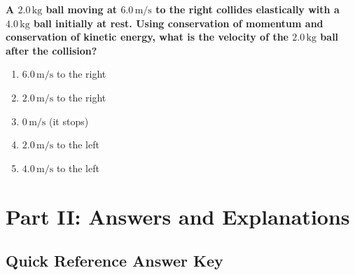 \documentclass[12pt,letterpaper]{article}
\begin{document}
\begin{questionbox}
\textbf{A $2.0\,\text{kg}$ ball moving at $6.0\,\text{m/s}$ to the right collides elastically with a $4.0\,\text{kg}$ ball initially at rest. Using conservation of momentum and conservation of kinetic energy, what is the velocity of the $2.0\,\text{kg}$ ball after the collision?}

\begin{enumerate}[label=\alph*)]
    \item $6.0\,\text{m/s}$ to the right
    \item $2.0\,\text{m/s}$ to the right
    \item $0\,\text{m/s}$ (it stops)
    \item $2.0\,\text{m/s}$ to the left
    \item $4.0\,\text{m/s}$ to the left
\end{enumerate}
\end{questionbox}


\newpage

\section*{Part II: Answers and Explanations}

\subsection*{Quick Reference Answer Key}
\end{document}
